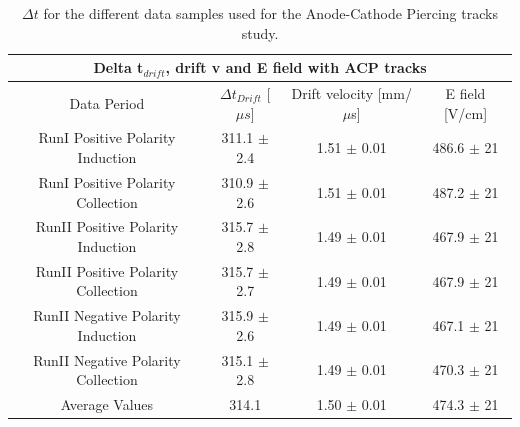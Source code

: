 \begin{center}
\begin{table}[htb]
  \begin{center}
    \begin{tabular}{|c|c|c|c|}
      \multicolumn{4}{c}{\textbf{Delta t$_{drift}$, drift v and E field with ACP tracks}} \\
      \hline \hline
       Data Period  & $\Delta t_{Drift}$ [$\mu s$] & Drift velocity [mm/$\mu$s] & E field [V/cm] \\
       \hline
       RunI Positive Polarity Induction &  311.1 $\pm$ 2.4   &1.51 $\pm$ 0.01  & 486.6 $\pm$ 21\\
       \hline
       RunI Positive Polarity Collection &  310.9 $\pm$ 2.6 & 1.51 $\pm$ 0.01  &  487.2 $\pm$ 21\\
       \hline
       RunII Positive Polarity Induction &   315.7 $\pm$ 2.8 & 1.49 $\pm$ 0.01 &  467.9 $\pm$ 21\\
       \hline
       RunII Positive Polarity Collection &  315.7 $\pm$ 2.7 & 1.49 $\pm$ 0.01 &  467.9 $\pm$ 21\\
       \hline
       RunII Negative Polarity Induction &   315.9 $\pm$ 2.6 & 1.49 $\pm$ 0.01  & 467.1 $\pm$ 21 \\
       \hline
       RunII Negative Polarity Collection &  315.1 $\pm$ 2.8 & 1.49 $\pm$ 0.01  & 470.3 $\pm$ 21  \\
       \hline
       \hline
       Average Values & 314.1 & 1.50 $\pm$ 0.01 & 474.3 $\pm$ 21 \\
       \hline
       \end{tabular}
    \caption{$\Delta t$ for the different data samples used for the Anode-Cathode Piercing tracks study. }
    \label{tab:deltaTACP}
    \end{center}
\end{table}
\end{center}


